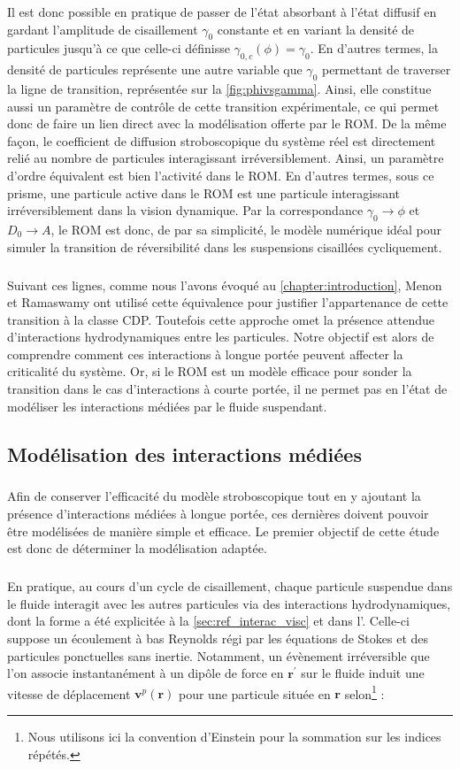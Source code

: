 \noindent Il est donc possible en pratique de passer de l'état absorbant à l'état diffusif en gardant l'amplitude de cisaillement $\gamma_0$ constante et en variant la densité de particules jusqu'à ce que celle-ci définisse $\gamma_{0,c}(\phi) = \gamma_0$. En d'autres termes, la densité de particules représente une autre variable que $\gamma_0$ permettant de traverser la ligne de transition, représentée sur la \autoref{fig:phivsgamma}. Ainsi, elle constitue aussi un paramètre de contrôle de cette transition expérimentale, ce qui permet donc de faire un lien direct avec la modélisation offerte par le ROM. De la même façon, le coefficient de diffusion stroboscopique du système réel est directement relié au nombre de particules interagissant irréversiblement. Ainsi, un paramètre d'ordre équivalent est bien l'activité dans le ROM. En d'autres termes, sous ce prisme, une particule active dans le ROM est une particule interagissant irréversiblement dans la vision dynamique. Par la correspondance $\gamma_0 \rightarrow \phi$ et $D_0\rightarrow A$, le ROM est donc, de par sa simplicité, le modèle numérique idéal pour simuler la transition de réversibilité dans les suspensions cisaillées cycliquement.

\subparagraph{}Suivant ces lignes, comme nous l'avons évoqué au \autoref{chapter:introduction}, Menon et Ramaswamy \cite{menon_universality_2009} ont utilisé cette équivalence pour justifier l'appartenance de cette transition à la classe CDP. Toutefois cette approche omet la présence attendue d'interactions hydrodynamiques entre les particules. Notre objectif est alors de comprendre comment ces interactions à longue portée peuvent affecter la criticalité du système. Or, si le ROM est un modèle efficace pour sonder la transition dans le cas d'interactions à courte portée, il ne permet pas en l'état de modéliser les interactions médiées par le fluide suspendant.

\subsection{Modélisation des interactions médiées}

\subparagraph{}Afin de conserver l'efficacité du modèle stroboscopique tout en y ajoutant la présence d'interactions médiées à longue portée, ces dernières doivent pouvoir être modélisées de manière simple et efficace. Le premier objectif de cette étude est donc de déterminer la modélisation adaptée.

\subparagraph{}En pratique, au cours d'un cycle de cisaillement, chaque particule suspendue dans le fluide interagit avec les autres particules via des interactions hydrodynamiques, dont la forme a été explicitée à la \autoref{sec:ref_interac_visc} et dans l'. Celle-ci suppose un écoulement à bas Reynolds régi par les équations de Stokes et des particules ponctuelles sans inertie. Notamment, un évènement irréversible que l'on associe instantanément à un dipôle de force en $\mathbf{r}^\prime$ sur le fluide induit une vitesse de déplacement $\mathbf{v}^p(\mathbf{r})$ pour une particule située en $\mathbf{r}$ selon\footnote{Nous utilisons ici la convention d'Einstein pour la sommation sur les indices répétés.} :

